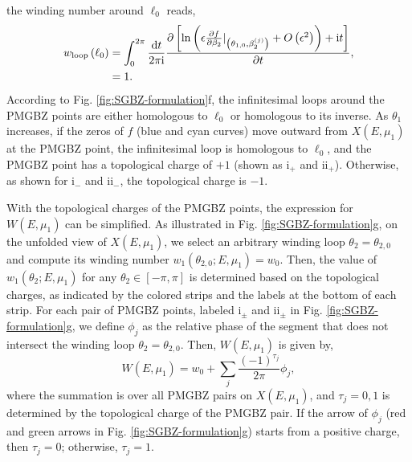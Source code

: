 \documentclass[pdflatex,sn-nature, iicol]{sn-jnl}%
\theoremstyle{thmstyleone}%
\theoremstyle{thmstyletwo}%
\theoremstyle{thmstylethree}%
\begin{document}
the winding number around $\ell_{0}$ reads, 
\begin{align}
w_{\text{loop}}\left(\ell_{0}\right) & =\int_{0}^{2\pi}\frac{\mathrm{d} t}{2\pi\mathrm{i}}\frac{\partial\left[\ln\left(\epsilon\frac{\partial f}{\partial\beta_{2}}|_{\left(\theta_{1,0},\beta_{2}^{(j)}\right)}+O\left(\epsilon^{2}\right)\right)+\mathrm{i} t\right]}{\partial t},\nonumber \\
 & =1.
\end{align}
According to Fig. \ref{fig:SGBZ-formulation}f, the infinitesimal
loops around the PMGBZ points are either homologous to $\ell_{0}$
or homologous to its inverse. As $\theta_{1}$ increases, if the zeros
of $f$ (blue and cyan curves) move outward from $X(E,\mu_{1})$ at
the PMGBZ point, the infinitesimal loop is homologous to $\ell_{0}$,
and the PMGBZ point has a topological charge of $+1$ (shown as $\text{i}_{+}$
and $\text{ii}_{+}$). Otherwise, as shown for $\text{i}_{-}$ and
$\text{ii}_{-}$, the topological charge is $-1$.

With the topological charges of the PMGBZ points, the expression for
$W(E,\mu_{1})$ can be simplified. As illustrated in Fig. \ref{fig:SGBZ-formulation}g,
on the unfolded view of $X(E,\mu_{1})$, we select an arbitrary winding
loop $\theta_{2}=\theta_{2,0}$ and compute its winding number $w_{1}(\theta_{2,0};E,\mu_{1})=w_{0}$.
Then, the value of $w_{1}(\theta_{2};E,\mu_{1})$ for any $\theta_{2}\in[-\pi,\pi]$
is determined based on the topological charges, as indicated by the
colored strips and the labels at the bottom of each strip. For each
pair of PMGBZ points, labeled $\text{i}_{\pm}$ and $\text{ii}_{\pm}$
in Fig. \ref{fig:SGBZ-formulation}g, we define $\phi_{j}$ as the
relative phase of the segment that does not intersect the winding
loop $\theta_{2}=\theta_{2,0}$. Then, $W(E,\mu_1)$ is
given by, 
\begin{equation}
W\left(E,\mu_{1}\right)=w_{0}+\sum_{j}\frac{\left(-1\right)^{\tau_{j}}}{2\pi}\phi_{j}, \label{eq:W-eq-simplified}
\end{equation}
where the summation is over all PMGBZ pairs on $X(E,\mu_{1})$, and
$\tau_{j}=0,1$ is determined by the topological charge of the PMGBZ
pair. If the arrow of $\phi_{j}$ (red and green arrows in Fig. \ref{fig:SGBZ-formulation}g)
starts from a positive charge, then $\tau_{j}=0$; otherwise, $\tau_{j}=1$.
\end{document}
